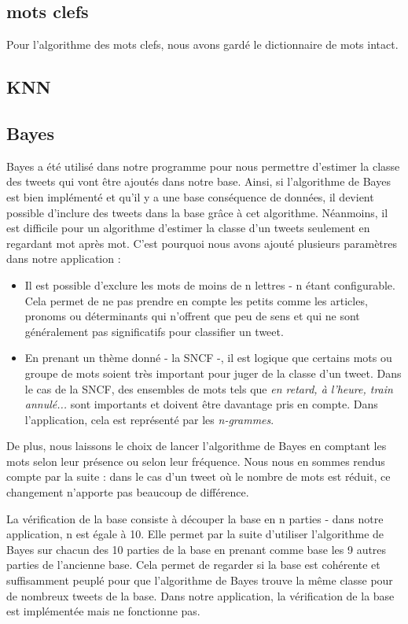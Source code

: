 \documentclass[a4paper,10pt]{report}
\begin{document}
    \subsection{mots clefs}
      Pour l'algorithme des mots clefs, nous avons gardé le dictionnaire de mots intact.
          
      
    \subsection{KNN}
    
      
    \subsection{Bayes}
      Bayes a été utilisé dans notre programme pour nous permettre d'estimer la classe des tweets qui vont être ajoutés dans notre base. Ainsi, si l'algorithme de Bayes est bien implémenté et qu'il y a une base conséquence de données, il devient possible d'inclure des tweets dans la base grâce à cet algorithme.
      Néanmoins, il est difficile pour un algorithme d'estimer la classe d'un tweets seulement en regardant mot après mot. C'est pourquoi nous avons ajouté plusieurs paramètres dans notre application :
      \begin{itemize}
	    \item Il est possible d'exclure les mots de moins de n lettres - n étant configurable. Cela permet de ne pas prendre en compte les petits comme les articles, pronoms ou déterminants qui n'offrent que peu de sens et qui ne sont généralement pas significatifs pour classifier un tweet. 
	    \item En prenant un thème donné - la SNCF -, il est logique que certains mots ou groupe de mots soient très important pour juger de la classe d'un tweet. Dans le cas de la SNCF, des ensembles de mots tels que \textit{en retard, à l'heure, train annulé...} sont importants et doivent être davantage pris en compte. Dans l'application, cela est représenté par les \textit{n-grammes}.
      \end{itemize}
      De plus, nous laissons le choix de lancer l'algorithme de Bayes en comptant les mots selon leur présence ou selon leur fréquence.
      Nous nous en sommes rendus compte par la suite : dans le cas d'un tweet où le nombre de mots est réduit, ce changement n'apporte pas beaucoup de différence.
      
      
      La vérification de la base consiste à découper la base en n parties - dans notre application, n est égale à 10.
      Elle permet par la suite d'utiliser l'algorithme de Bayes sur chacun des 10 parties de la base en prenant comme base les 9 autres parties de l'ancienne base.
      Cela permet de regarder si la base est cohérente et suffisamment peuplé pour que l'algorithme de Bayes trouve la même classe pour de nombreux tweets de la base.
      Dans notre application, la vérification de la base est implémentée mais ne fonctionne pas.
\end{document}
